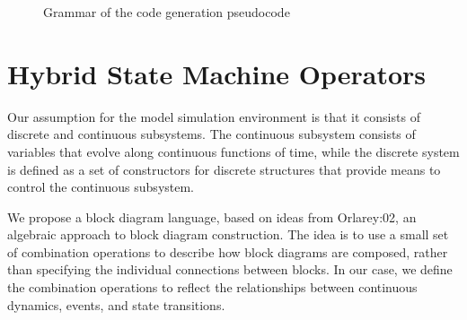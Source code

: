 \documentclass[a4paper]{article}
\begin{document}
\begin{figure}
{
}
\caption{\label{Fig:PseudocodeSyntax}Grammar of the code generation pseudocode}\end{figure}

\section{Hybrid State Machine Operators}
\label{sec:hsm}


Our assumption for the model simulation environment is that it
consists of discrete and continuous subsystems. The continuous
subsystem consists of variables that evolve along continuous functions
of time, while the discrete system is defined as a set of constructors
for discrete structures that provide means to control the continuous
subsystem.

We propose a block diagram language, based on ideas from
Orlarey:02, an algebraic approach to block diagram
construction. The idea is to use a small set of combination operations
to describe how block diagrams are composed, rather than specifying
the individual connections between blocks. In our case, we define the
combination operations to reflect the relationships between continuous
dynamics, events, and state transitions.
\end{document}
